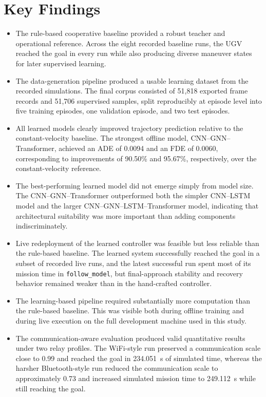 \section{Key Findings}
\begin{itemize}
    \item The rule-based cooperative baseline provided a robust teacher and operational reference. Across the eight recorded baseline runs, the UGV reached the goal in every run while also producing diverse maneuver states for later supervised learning.
    \item The data-generation pipeline produced a usable learning dataset from the recorded simulations. The final corpus consisted of 51,818 exported frame records and 51,706 supervised samples, split reproducibly at episode level into five training episodes, one validation episode, and two test episodes.
    \item All learned models clearly improved trajectory prediction relative to the constant-velocity baseline. The strongest offline model, CNN--GNN--Transformer, achieved an ADE of 0.0094 and an FDE of 0.0060, corresponding to improvements of 90.50\% and 95.67\%, respectively, over the constant-velocity reference.
    \item The best-performing learned model did not emerge simply from model size. The CNN--GNN--Transformer outperformed both the simpler CNN--LSTM model and the larger CNN--GNN--LSTM--Transformer model, indicating that architectural suitability was more important than adding components indiscriminately.
    \item Live redeployment of the learned controller was feasible but less reliable than the rule-based baseline. The learned system successfully reached the goal in a subset of recorded live runs, and the latest successful run spent most of its mission time in \texttt{follow\_model}, but final-approach stability and recovery behavior remained weaker than in the hand-crafted controller.
    \item The learning-based pipeline required substantially more computation than the rule-based baseline. This was visible both during offline training and during live execution on the full development machine used in this study.
    \item The communication-aware evaluation produced valid quantitative results under two relay profiles. The WiFi-style run preserved a communication scale close to 0.99 and reached the goal in 234.051~s of simulated time, whereas the harsher Bluetooth-style run reduced the communication scale to approximately 0.73 and increased simulated mission time to 249.112~s while still reaching the goal.
\end{itemize}

